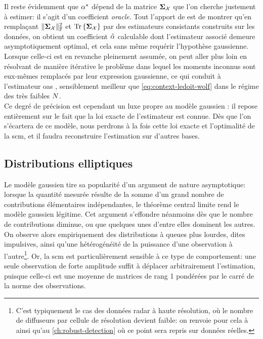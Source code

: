Il reste évidemment que $\alpha^\star$ dépend de la matrice $\boldsymbol{\Sigma}_{\mathcal{X}}$ que l'on cherche justement à estimer: il s'agit d'un coefficient \emph{oracle}. Tout l'apport de  est de montrer qu'en remplaçant $\|\boldsymbol{\Sigma}_{\mathcal{X}}\|_{\mathbb{F}}^2$ et $\operatorname{\operatorname{Tr}}\left\{\boldsymbol{\Sigma}_{\mathcal{X}}\right\}$ par des estimateurs consistants construits sur les données, on obtient un coefficient $\hat{\alpha}$ calculable dont l'estimateur associé demeure asymptotiquement optimal, et cela sans même requérir l'hypothèse gaussienne. Lorsque celle-ci est en revanche pleinement assumée, on peut aller plus loin en résolvant de manière itérative le problème dans lequel les moments inconnus sont eux-mêmes remplacés par leur expression gaussienne, ce qui conduit à l'estimateur oas , sensiblement meilleur que \cref{eq:context-ledoit-wolf} dans le régime des très faibles $N$. \\

Ce degré de précision est cependant un luxe propre au modèle gaussien : il repose entièrement sur le fait que la loi exacte de l'estimateur est connue. Dès que l'on s'écartera de ce modèle, nous perdrons à la fois cette loi exacte et l'optimalité de la scm, et il faudra reconstruire l'estimation sur d'autres bases. \\


\subsection{Distributions elliptiques}
\label{subsec:context-distributions-elliptical}

Le modèle gaussien tire sa popularité d'un argument de nature asymptotique: lorsque la quantité mesurée résulte de la somme d'un grand nombre de contributions élémentaires indépendantes, le théorème central limite rend le modèle gaussien légitime. Cet argument s'effondre néanmoins dès que le nombre de contributions diminue, ou que quelques unes d'entre elles dominent les autres. On observe alors empiriquement des distributions à queues plus lourdes, dites impulsives, ainsi qu'une hétérogénéité de la puissance d'une observation à l'autre\footnote{C'est typiquement le cas des données radar à haute résolution, où le nombre de diffuseurs par cellule de résolution devient faible: on renvoie pour cela à  ainsi qu'au \cref{ch:robust-detection} où ce point sera repris sur données réelles.}. Or, la scm est particulièrement sensible à ce type de comportement: une seule observation de forte amplitude suffit à déplacer arbitrairement l'estimation, puisque celle-ci est une moyenne de matrices de rang 1 pondérées par le carré de la norme des observations. \\

